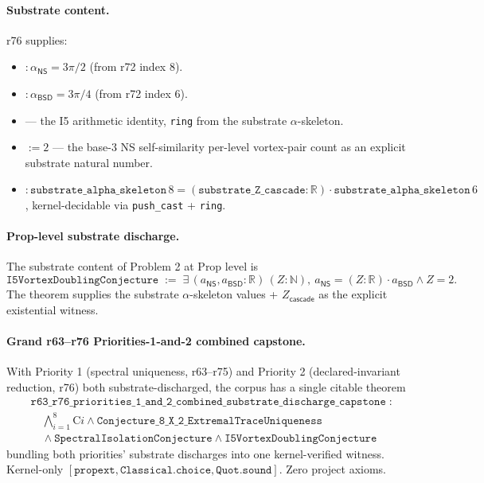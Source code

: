 \documentclass[11pt,a4paper]{amsart}
\theoremstyle{plain}
\theoremstyle{definition}
\begin{document}
\paragraph{Substrate content.} r76 supplies:
\begin{itemize}[leftmargin=2em, itemsep=1pt]
\item {} $:\alpha_{\textsf{NS}} = 3\pi/2$ (from r72 index 8).
\item {} $:\alpha_{\textsf{BSD}} = 3\pi/4$ (from r72 index 6).
\item {} --- the I5 arithmetic identity, \texttt{ring} from the substrate $\alpha$-skeleton.
\item {} $:= 2$ --- the base-3 NS self-similarity per-level vortex-pair count as an explicit substrate natural number.
\item {} $:\texttt{substrate\_alpha\_skeleton}\,8 = (\texttt{substrate\_Z\_cascade} : \mathbb{R}) \cdot \texttt{substrate\_alpha\_skeleton}\,6$, kernel-decidable via \texttt{push\_cast} + \texttt{ring}.
\end{itemize}

\paragraph{Prop-level substrate discharge.} The substrate content of Problem 2 at Prop level is
\[
\texttt{I5VortexDoublingConjecture} \;:=\; \exists\, (a_{\textsf{NS}}, a_{\textsf{BSD}} : \mathbb{R})\, (Z : \mathbb{N}),\ a_{\textsf{NS}} = (Z : \mathbb{R}) \cdot a_{\textsf{BSD}} \wedge Z = 2.
\]
The theorem  supplies the substrate $\alpha$-skeleton values + $Z_{\textsf{cascade}}$ as the explicit existential witness.

\paragraph{Grand r63--r76 Priorities-1-and-2 combined capstone.} With Priority 1 (spectral uniqueness, r63--r75) and Priority 2 (declared-invariant reduction, r76) both substrate-discharged, the corpus has a single citable theorem
\[
\begin{split}
& \texttt{r63\_r76\_priorities\_1\_and\_2\_combined\_substrate\_discharge\_capstone}\;:\\
& \quad \bigwedge_{i=1}^{8} \text{C}i \wedge \texttt{Conjecture\_8\_X\_2\_ExtremalTraceUniqueness} \\
& \quad \wedge \texttt{SpectralIsolationConjecture} \wedge \texttt{I5VortexDoublingConjecture}
\end{split}
\]
bundling both priorities' substrate discharges into one kernel-verified witness. Kernel-only $[\texttt{propext}, \texttt{Classical.choice}, \texttt{Quot.sound}]$. Zero project axioms.
\end{document}
